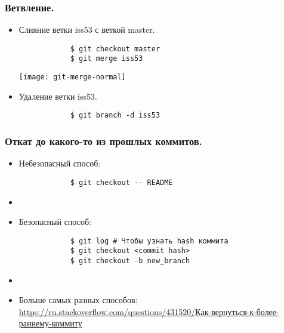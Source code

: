 \documentclass[]{beamer}
\begin{document}
\begin{frame}[fragile] \frametitle{Ветвление.}
	\begin{itemize}
		\item Слияние ветки iss53 с веткой master.
		\begin{verbatim}
			$ git checkout master
			$ git merge iss53
		\end{verbatim}

		\begin{center}
			\texttt{[image: git-merge-normal]}
		\end{center}

		\item Удаление ветки iss53.
		\begin{verbatim}
			$ git branch -d iss53
		\end{verbatim}
	\end{itemize}
\end{frame}

\begin{frame}[fragile] \frametitle{Откат до какого-то из прошлых коммитов.}
	\begin{itemize}
		\item Небезопасный способ:
		\begin{verbatim}
			$ git checkout -- README
		\end{verbatim}
		\item[~]

		\item Безопасный способ:
		\begin{verbatim}
			$ git log # Чтобы узнать hash коммита
			$ git checkout <commit hash>
			$ git checkout -b new_branch
		\end{verbatim}
		\item[~]
		\item Больше самых разных способов: \newline
		\href{https://ru.stackoverflow.com/questions/431520/%D0%9A%D0%B0%D0%BA-%D0%B2%D0%B5%D1%80%D0%BD%D1%83%D1%82%D1%8C%D1%81%D1%8F-%D0%BE%D1%82%D0%BA%D0%B0%D1%82%D0%B8%D1%82%D1%8C%D1%81%D1%8F-%D0%BA-%D0%B1%D0%BE%D0%BB%D0%B5%D0%B5-%D1%80%D0%B0%D0%BD%D0%BD%D0%B5%D0%BC%D1%83-%D0%BA%D0%BE%D0%BC%D0%BC%D0%B8%D1%82%D1%83}{https://ru.stackoverflow.com/questions/431520/Как-вернуться-к-более-раннему-коммиту}
	\end{itemize}
\end{frame}
\end{document}
